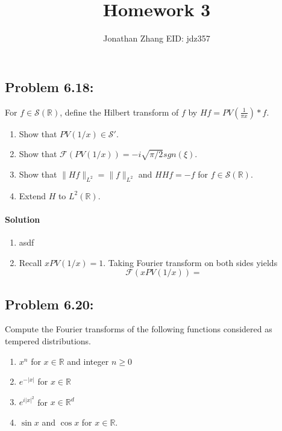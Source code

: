 \documentclass[letterpaper,twoside,11pt]{article}
\theoremstyle{mystyle}
\newcommand{\R}{{\mathbb R}}
\newcommand{\cbk}{\color{black}}
\newcommand{\cred}{\color{red}}
\newcommand{\sch}{\mathcal S}
\begin{document}
\title{\vspace{-2\baselineskip} 
Homework 3
}
\author{Jonathan Zhang \qquad EID: { jdz357} }
\date{}
\maketitle

\cred 
\subsection*{Problem 6.18:}
 For $f\in \mathcal S (\R)$, define the Hilbert transform of $f$ by $Hf = PV\left( \frac{1}{\pi x} \right) \ast f$.
\begin{enumerate}
  \item Show that $PV(1/x)\in \sch '$.
  \item Show that $\mathcal F \left( PV\left( 1/x \right) \right) = -i\sqrt{\pi/2} sgn\left( \xi \right)$. 
  \item Show that $\|Hf\|_{L^2} = \|f\|_{L^2}$ and $HHf = -f$ for $f \in \sch \left( \R \right)$.  
  \item Extend $H$ to $L^2\left( \R \right)$. 
\end{enumerate}

\paragraph*{Solution}
\begin{enumerate}
  \item asdf
  \item Recall $xPV\left( 1/x \right)=1$. Taking Fourier transform on both sides yields 
  \[\mathcal F \left( xPV\left( 1/x \right) \right) = \]
\end{enumerate}










\cbk 


\subsection*{Problem 6.20:}
Compute the Fourier transforms of the following functions considered as tempered distributions. 
\begin{enumerate}
  \item $x^n$ for $x \in \R$ and integer $n\geq 0$
  \item $e^{-|x|}$ for $x\in \R$
  \item $e^{i|x|^2}$ for $x \in \R^d$
  \item $\sin x$ and $\cos x$ for $x\in \R$. 
\end{enumerate}
\end{document}
